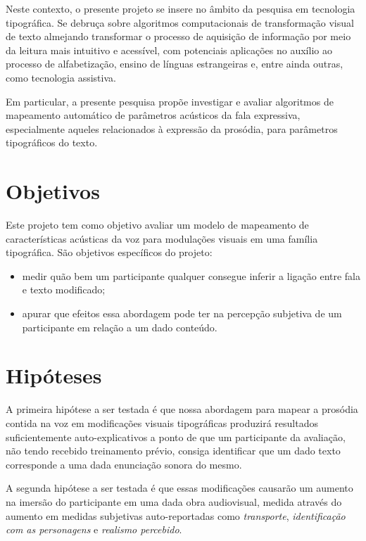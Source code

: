 \documentclass[a4paper,11pt,titlepage,singlespacing]{article}
\begin{document}
Neste contexto, o presente projeto se insere no âmbito da pesquisa em tecnologia tipográfica. Se debruça sobre algoritmos computacionais de transformação visual de texto almejando transformar o processo de aquisição de informação por meio da leitura mais intuitivo e acessível, com potenciais aplicações no auxílio ao processo de alfabetização, ensino de línguas estrangeiras e, entre ainda outras, como tecnologia assistiva.

Em particular, a presente pesquisa propõe investigar e avaliar algoritmos de mapeamento automático de parâmetros acústicos da fala expressiva, especialmente aqueles relacionados à expressão da prosódia, para parâmetros tipográficos do texto.



\section{Objetivos}

\noindent Este projeto tem como objetivo avaliar um modelo de mapeamento de características acústicas da voz para modulações visuais em uma família tipográfica. 
São objetivos específicos do projeto:
\begin{itemize}
    \item medir quão bem um participante qualquer consegue inferir a ligação entre fala e texto modificado;
    \item apurar que efeitos essa abordagem pode ter na percepção subjetiva de um participante em relação a um dado conteúdo.
\end{itemize} 

\section{Hipóteses}

\noindent A primeira hipótese a ser testada é que nossa abordagem para mapear a prosódia contida na voz em modificações visuais tipográficas produzirá resultados suficientemente auto-explicativos a ponto de que um participante da avaliação, não tendo recebido treinamento prévio, consiga identificar que um dado texto corresponde a uma dada enunciação sonora do mesmo.

A segunda hipótese a ser testada é que essas modificações causarão um aumento na imersão do participante em uma dada obra audiovisual, medida através do aumento em medidas subjetivas auto-reportadas como \textit{transporte}, \textit{identificação com as personagens} e \textit{realismo percebido}.
\end{document}
